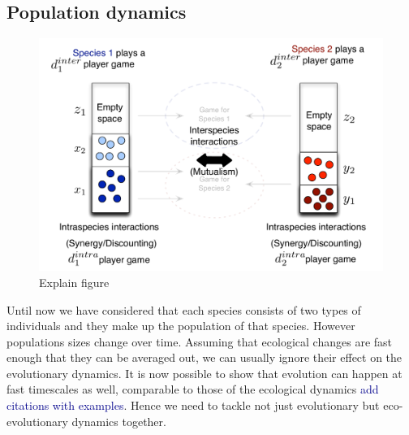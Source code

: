 \documentclass{pnastwo}
\newcommand{\cha}[1]{\textcolor{darkblue}{#1}}
\begin{document}
\begin{article}
\subsection{Population dynamics}
%
\begin{figure}
\begin{center}
\includegraphics[width=\columnwidth]{../Figures/popdyninterintra.pdf}
\caption{
Explain figure
}
\end{center}
\end{figure}
%
Until now we have considered that each species consists of two types of individuals and they make up the population of that species.
However populations sizes change over time. 
Assuming that ecological changes are fast enough that they can be averaged out, we can usually ignore their effect on the evolutionary dynamics.
It is now possible to show that evolution can happen at fast timescales as well, comparable to those of the ecological dynamics \cha{add citations with examples}.
Hence we need to tackle not just evolutionary but eco-evolutionary dynamics together.


\end{article}
\end{document}
